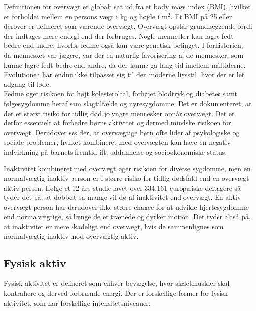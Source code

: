 Definitionen for overvægt er globalt sat ud fra et body mass index (BMI), hvilket er forholdet mellem en persons vægt i kg og højde i m$^2$. Et BMI på 25 eller derover er defineret som værende overvægt.\citep{Academic2016} Overvægt opstår grundlæggende fordi der indtages mere endegi end der forbruges. Nogle mennesker kan lagre fedt bedre end andre, hvorfor fedme også kan være genetisk betinget.\citep{Nestle2014} I forhistorien, da mennesket var jægere, var der en naturlig favorisering af de mennesker, som kunne lagre fedt bedre end andre, da der kunne gå lang tid imellem måltiderne. Evolutionen har endnu ikke tilpasset sig til den moderne livsstil, hvor der er let adgang til føde. \citep{Ahmad2014} \\
Fedme øger risikoen for højt kolesteroltal, forhøjet blodtryk og diabetes samt følgesygdomme heraf som slagtilfælde og nyresygdomme. Det er dokumenteret, at der er størst risiko for tidlig død jo yngre mennesker opnår overvægt. Det er derfor essentielt at forbedre børns aktivitet og dermed mindske risikoen for overvægt.\citep{Nestle2014} Derudover ses der, at overvægtige børn ofte lider af psykologiske og sociale problemer, hvilket kombineret med overvægten kan have en negativ indvirkning på barnets fremtid ift. uddannelse og socioøkonomiske status\citep{Academic2016}.

Inaktivitet kombineret med overvægt øger risikoen for diverse sygdomme, men en normalvægtig inaktiv person er i større risiko for tidlig dødsfald end en overvægt aktiv person. Ifølge et 12-års studie lavet over 334.161 europæiske deltagere så tyder det på, at dobbelt så mange vil dø af inaktivitet end overvægt.\citep{Ekelund2015} En aktiv overvægt person har derudover ikke større chance for at udvikle hjertesygdomme end normalvægtige, så længe de er trænede og dyrker motion\citep{Nichols2014}. Det tyder altså på, at inaktivitet er mere skadeligt end overvægt, hvis de sammenlignes som normalvægtig inaktiv mod overvægtig aktiv.

\subsection{Fysisk aktiv}
Fysisk aktivitet er defineret som enhver bevægelse, hvor skeletmuskler skal kontrahere og derved forbrænde energi. Der er forskellige former for fysisk aktivitet, som har forskellige intensitetsniveauer.\citep{Academic2016a}  %
